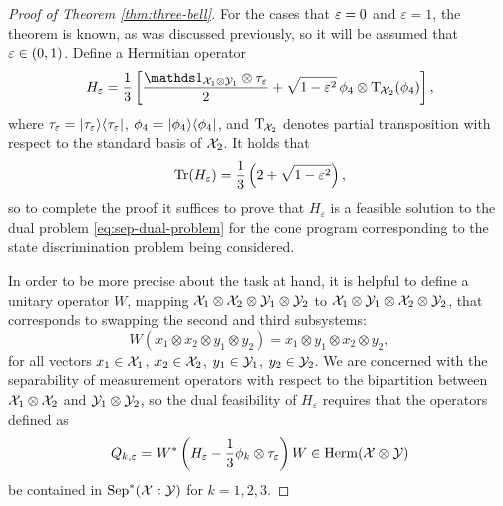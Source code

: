 \begin{proof}[Proof of Theorem \ref{thm:three-bell}]
  For the cases that $\varepsilon = 0$ and $\varepsilon = 1$, the theorem is known,
  as was discussed previously, so it will be assumed that $\varepsilon \in (0,1)$.
  Define a Hermitian operator
  \begin{equation}
    H_{\eps} = \frac{1}{3}\left[\frac{\I_{\X_1\otimes\Y_1}\otimes
        \tau_{\eps}}{2} + \sqrt{1 - \eps^{2}} \, \phi_{4} \otimes
      \pt_{\negsmallspace\X_2}(\phi_{4}) \right],
  \end{equation}
  where $\tau_{\varepsilon} = \lvert\mspace{0.5mu} \tau_{\varepsilon} \mspace{0.5mu} \rangle\langle\mspace{0.5mu} \tau_{\varepsilon} \mspace{0.5mu} \rvert$,
  $\phi_{4} = \lvert\mspace{0.5mu} \phi_{4} \mspace{0.5mu} \rangle\langle\mspace{0.5mu} \phi_{4} \mspace{0.5mu} \rvert$,
  and $\operatorname{T}_{\mspace{-1.5mu}\mathcal{X}_2}$ denotes partial transposition with respect to
  the standard basis of $\mathcal{X}_2$.
  It holds that
  \begin{equation}
    \operatorname{Tr}(H_{\varepsilon}) = \frac{1}{3}\left(2 + \sqrt{1 - \varepsilon^{2}}\right),
  \end{equation}
  so to complete the proof it suffices to prove that $H_{\varepsilon}$ is a
  feasible solution to the dual problem \eqref{eq:sep-dual-problem}
  for the cone program corresponding to the state discrimination problem being considered.

  In order to be more precise about the task at hand, it is helpful to define a
  unitary operator $W$, mapping $\mathcal{X}_1\otimes\mathcal{X}_2\otimes\mathcal{Y}_1\otimes\mathcal{Y}_2$ to
  $\mathcal{X}_1\otimes\mathcal{Y}_1\otimes\mathcal{X}_2\otimes\mathcal{Y}_2$, that corresponds to swapping the
  second and third subsystems:
  \begin{equation}
    \label{eq:swap}
    W(x_{1}\otimes x_{2}\otimes y_{1}\otimes y_{2}) =
    x_{1}\otimes y_{1}\otimes x_{2}\otimes y_{2},
  \end{equation}
  for all vectors 
  $x_{1}\in\mathcal{X}_{1}$, $x_{2}\in\mathcal{X}_{2}$, $y_{1}\in\mathcal{Y}_{1}$, $y_{2}\in\mathcal{Y}_{2}$.
  We are concerned with the separability of measurement operators with respect
  to the bipartition between $\mathcal{X}_1\otimes\mathcal{X}_2$ and $\mathcal{Y}_1\otimes\mathcal{Y}_2$, so the
  dual feasibility of $H_{\varepsilon}$ requires that the operators defined as
  \begin{equation}
    Q_{k, \varepsilon} = W^{\ast} \left( H_{\varepsilon} - \frac{1}{3}\phi_{k} \otimes 
    \tau_{\varepsilon} \right) W \in \mathrm{Herm}(\mathcal{X}\otimes\mathcal{Y})
  \end{equation}
  be contained in $\mathrm{Sep}^{\ast}(\mathcal{X}:\mathcal{Y})$ for $k = 1,2,3$.


\end{proof}
